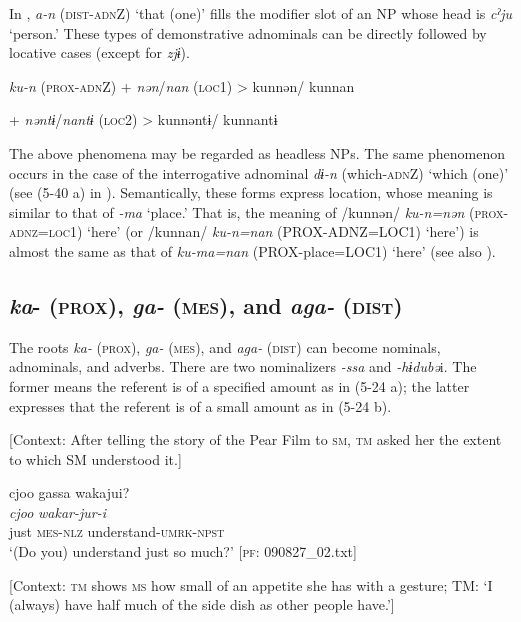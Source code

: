 In , \textit{a-n} (\textsc{dist}-\textsc{adn}Z) ‘that (one)’ fills the modifier slot of an NP whose head is \textit{cˀju} ‘person.’ These types of demonstrative adnominals can be directly followed by locative cases (except for \textit{zjɨ}).

\ea \label{ex:5:23}   \textit{ku-n}  (\textsc{prox}-\textsc{adn}Z)  +  \textit{nən}/\textit{nan}  (\textsc{loc}1)  >  kunnən/ kunnan

      +  \textit{nəntɨ}/\textit{nantɨ}  (\textsc{loc}2)  >  kunnəntɨ/ kunnantɨ
\z

The above phenomena may be regarded as headless NPs. The same phenomenon occurs in the case of the interrogative adnominal \textit{dɨ-n} (which-\textsc{adn}Z) ‘which (one)’ (see (5-40 a) in ). Semantically, these forms express location, whose meaning is similar to that of \textit{{}-ma} ‘place.’ That is, the meaning of /kunnən/ \textit{ku-n=nən} (\textsc{prox}-\textsc{adnz}=\textsc{loc}1) ‘here’ (or /kunnan/ \textit{ku-n=nan} (PROX-ADNZ=LOC1) ‘here’) is almost the same as that of \textit{ku-ma=nan} (PROX-place=LOC1) ‘here’ (see also ).

\subsection{\textit{ka}{}- (\textsc{prox}), \textit{ga-} (\textsc{mes}), and \textit{aga-} (\textsc{dist})}

The roots \textit{ka-} (\textsc{prox}), \textit{ga-} (\textsc{mes}), and \textit{aga-} (\textsc{dist}) can become nominals, adnominals, and adverbs. There are two nominalizers \textit{{}-ssa} and \textit{{}-hɨdubə}i. The former means the referent is of a specified amount as in (5-24 a); the latter expresses that the referent is of a small amount as in (5-24 b).

\ea \label{ex:5:24}  \ea \label{ex:5:24a} [Context: After telling the story of the Pear Film to \textsc{sm}, \textsc{tm} asked her the extent to which SM understood it.]

\glll  cjoo  gassa  wakajui?\\
\textit{cjoo}  \textit{}  \textit{wakar-jur-i}\\
just  \textsc{mes}-\textsc{nlz}  understand-\textsc{umrk}-\textsc{npst}\\
\glt ‘(Do you) understand just so much?’ [\textsc{pf}: 090827\_02.txt]

 \ex \label{ex:5:24b} [Context: \textsc{tm} shows \textsc{ms} how small of an appetite she has with a gesture; TM: ‘I (always) have half much of the side dish as other people have.’]

